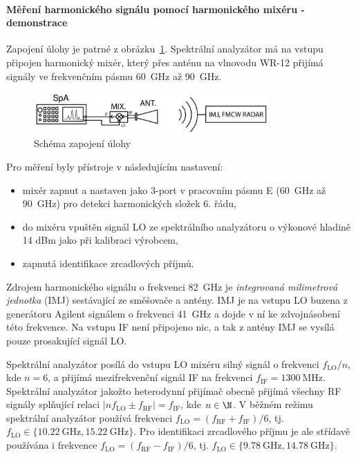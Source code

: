 \documentclass[11pt,a4paper]{article}
\newcommand{\MHz}{\mathrm{MHz}}
\newcommand{\GHz}{\mathrm{GHz}}
\begin{document}
\paragraph*{Měření harmonického signálu pomocí harmonického mixéru - demonstrace} Zapojení úlohy je patrné z obrázku~\ref{fig:task3-zapojeni}. Spektrální analyzátor má na vstupu připojen harmonický mixér, který přes anténu na vlnovodu WR-12 přijímá signály ve frekvenčním pásmu 60~GHz až 90~GHz.
\begin{figure}[!ht]
    \centering
    \includegraphics[width=0.8\textwidth]{src/task3-zapojeni.png}
    \caption{\label{fig:task3-zapojeni}Schéma zapojení úlohy}
\end{figure}
Pro měření byly přístroje v následujícím nastavení:
\begin{itemize}
    \item mixér zapnut a nastaven jako 3-port v pracovním pásmu E (60~GHz až 90~GHz) pro detekci harmonických složek 6. řádu,
    \item do mixéru vpuštěn signál LO ze spektrálního analyzátoru o výkonové hladině 14 dBm jako při kalibraci výrobcem,
    \item zapnutá identifikace zrcadlových příjmů.
\end{itemize}
Zdrojem harmonického signálu o frekvenci 82~GHz je \emph{integrovaná milimetrová jednotka} (IMJ) sestávající ze směšovače a antény. IMJ je na vstupu LO buzena z generátoru Agilent signálem o frekvenci 41~GHz a dojde v ní ke zdvojnásobení této frekvence. Na vstupu IF není připojeno nic, a tak z antény IMJ se vysílá pouze prosakující signál LO.

Spektrální analyzátor posílá do vstupu LO mixéru silný signál o frekvenci $f_{\mathrm{LO}}/n$, kde $n=6$, a přijímá mezifrekvenční signál IF na frekvenci $f_{\mathrm{IF}} = 1300\ \MHz$. Spektrální analyzátor jakožto heterodynní přijímač obecně přijímá všechny RF signály splňující relaci $|nf_{\mathrm{LO}}\pm f_{\mathrm{RF}}| = f_{\mathrm{IF}}$, kde $n \in \N$. V běžném režimu spektrální analyzátor používá frekvenci $f_{\mathrm{LO}} = (f_{\mathrm{RF}}+f_{\mathrm{IF}})/6$, tj. $f_{\mathrm{LO}} \in \{10.22\ \GHz,15.22\ \GHz\}$. Pro identifikaci zrcadlového příjmu je ale střídavě používána i frekvence $f_{\mathrm{LO}} = (f_{\mathrm{RF}} - f_{\mathrm{IF}})/6$, tj. $f_{\mathrm{LO}} \in \{9.78\ \GHz, 14.78\ \GHz\}$.
\end{document}
